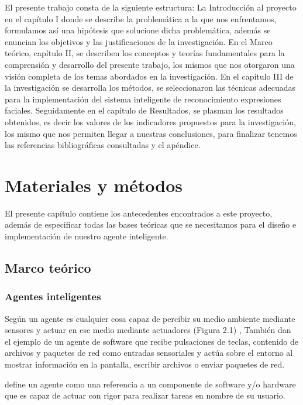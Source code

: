 El presente trabajo consta de la siguiente estructura: La Introducción al proyecto en el capítulo I donde se describe la problemática a la que nos enfrentamos, formulamos así una hipótesis que solucione dicha problemática, además se enuncian los objetivos y las justificaciones de la investigación. En el Marco teórico, capítulo II, se describen los conceptos y teorías fundamentales para la comprensión y desarrollo del presente trabajo, los mismos que nos otorgaron una visión completa de los temas abordados en la investigación. En el capítulo III de la investigación se desarrolla los métodos, se seleccionaron las técnicas adecuadas para la implementación del sistema inteligente de reconocimiento expresiones faciales. Seguidamente en el capítulo de Resultados, se plasman los resultados obtenidos, es decir los valores de los indicadores propuestos para la investigación, los mismo que nos permiten llegar a nuestras conclusiones, para finalizar tenemos las referencias bibliográficas consultadas y el apéndice.

\chapter{Materiales y métodos}

El presente capítulo contiene los antecedentes encontrados a este proyecto, además de especificar todas las bases teóricas que se necesitamos para el diseño e implementación de nuestro agente inteligente.


\section{Marco teórico}
\subsection{Agentes inteligentes}

Según \cite{Russel} un agente es cualquier cosa capaz de percibir su medio ambiente mediante sensores y actuar en ese medio mediante actuadores (Figura 2.1) , También dan el ejemplo de  un agente de software que recibe pulsaciones de teclas, contenido de archivos y paquetes de red como entradas sensoriales y actúa sobre el entorno al mostrar información en la pantalla, escribir archivos o enviar paquetes de red.

\cite{Nwana} define un agente como una referencia a un componente de software y/o hardware que es capaz de actuar con rigor para realizar tareas en nombre de su usuario.

